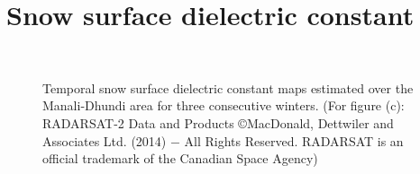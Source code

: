\section{Snow surface dielectric constant}
\FloatBarrier
\begin{figure}[!htbp]
	\centering
	\\
	\caption[Snow surface dielectric constant maps]{Temporal snow surface dielectric constant maps estimated over the Manali-Dhundi area for three consecutive winters. (For figure (c): RADARSAT-2 Data and Products ©MacDonald, Dettwiler and Associates Ltd. (2014) $-$ All Rights Reserved. RADARSAT is an official trademark of the Canadian Space Agency)} 
	\label{fig:SSD_results}
\end{figure}

